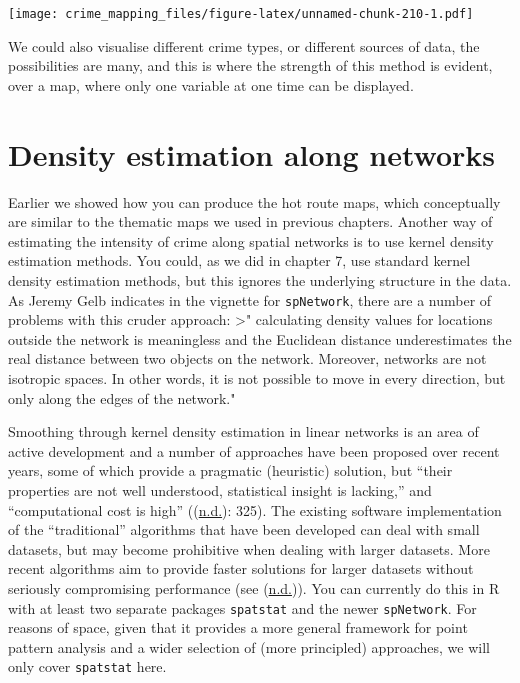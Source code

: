 \documentclass[
  krantz2]{krantz}
\begin{document}
\texttt{[image: crime\_mapping\_files/figure-latex/unnamed-chunk-210-1.pdf]}

We could also visualise different crime types, or different sources of data, the possibilities are many, and this is where the strength of this method is evident, over a map, where only one variable at one time can be displayed.

\hypertarget{density-estimation-along-networks}{%
\section{Density estimation along networks}\label{density-estimation-along-networks}}

Earlier we showed how you can produce the hot route maps, which conceptually are similar to the thematic maps we used in previous chapters. Another way of estimating the intensity of crime along spatial networks is to use kernel density estimation methods. You could, as we did in chapter 7, use standard kernel density estimation methods, but this ignores the underlying structure in the data. As Jeremy Gelb indicates in the vignette for \texttt{spNetwork}, there are a number of problems with this cruder approach:
\textgreater" calculating density values for locations outside the network is meaningless and the Euclidean distance underestimates the real distance between two objects on the network. Moreover, networks are not isotropic spaces. In other words, it is not possible to move in every direction, but only along the edges of the network."

Smoothing through kernel density estimation in linear networks is an area of active development and a number of approaches have been proposed over recent years, some of which provide a pragmatic (heuristic) solution, but ``their properties are not well understood, statistical insight is lacking,'' and ``computational cost is high'' ((\protect\hyperlink{ref-McSwiggan_2016}{n.d.}): 325). The existing software implementation of the ``traditional'' algorithms that have been developed can deal with small datasets, but may become prohibitive when dealing with larger datasets. More recent algorithms aim to provide faster solutions for larger datasets without seriously compromising performance (see (\protect\hyperlink{ref-Rakshit_2019}{n.d.})). You can currently do this in R with at least two separate packages \texttt{spatstat} and the newer \texttt{spNetwork}. For reasons of space, given that it provides a more general framework for point pattern analysis and a wider selection of (more principled) approaches, we will only cover \texttt{spatstat} here.
\end{document}
